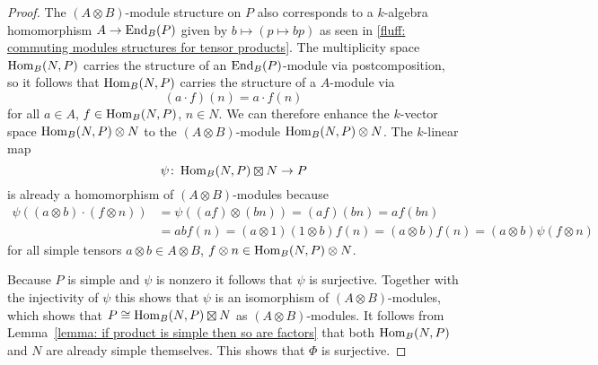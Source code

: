\begin{proof}
  The $(A \otimes B)$-module structure on $P$ also corresponds to a $k$-algebra homomorphism $A \to \operatorname{End}_B(P)$ given by $b \mapsto (p \mapsto bp)$ as seen in \ref{fluff: commuting modules structures for tensor products}. 
  The multiplicity space $\operatorname{Hom}_B(N,P)$ carries the structure of an $\operatorname{End}_B(P)$-module via postcomposition, so it follows that $\operatorname{Hom}_B(N,P)$ carries the structure of a $A$-module via
  \[
      (a \cdot f)(n)
    = a \cdot f(n)
  \]
  for all $a \in A$, $f \in \operatorname{Hom}_B(N,P)$, $n \in N$.
  We can therefore enhance the $k$-vector space $\operatorname{Hom}_B(N,P) \otimes N$ to the $(A \otimes B)$-module $\operatorname{Hom}_B(N,P) \otimes N$.
  The $k$-linear map
  \[
            \psi
    \colon  \Hom_B(N,P) \outertensor N
    \to     P
  \]
  is already a homomorphism of $(A \otimes B)$-modules because
  \begin{align*}
        \psi((a \otimes b) \cdot (f \otimes n))
    &=  \psi((af) \otimes (bn))
     =  (af)(bn)
     =  a f(bn) \\
    &=  a b f(n)
     =  (a \otimes 1)(1 \otimes b) f(n)
     =  (a \otimes b) f(n)
     =  (a \otimes b) \psi(f \otimes n)
  \end{align*}
  for all simple tensors $a \otimes b \in A \otimes B$, $f \otimes n \in \operatorname{Hom}_B(N,P) \otimes N$.
  
  Because $P$ is simple and $\psi$ is nonzero it follows that $\psi$ is surjective.
  Together with the injectivity of $\psi$ this shows that $\psi$ is an isomorphism of $(A \otimes B)$-modules, which shows that $P \cong \Hom_B(N,P) \outertensor N$ as $(A \otimes B)$-modules.
  It follows from Lemma~\ref{lemma: if product is simple then so are factors} that both $\operatorname{Hom}_B(N,P)$ and $N$ are already simple themselves.
  This shows that $\Phi$ is surjective.
\end{proof}




